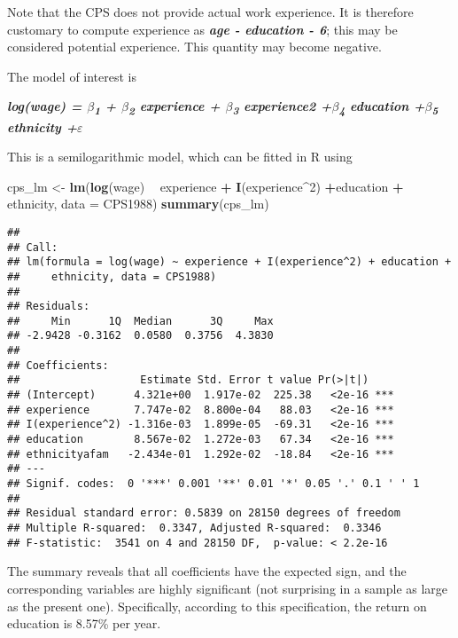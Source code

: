 \documentclass[]{article}
\newenvironment{Shaded}{\begin{snugshade}}{\end{snugshade}}
\newcommand{\KeywordTok}[1]{\textcolor[rgb]{0.13,0.29,0.53}{\textbf{#1}}}
\newcommand{\DataTypeTok}[1]{\textcolor[rgb]{0.13,0.29,0.53}{#1}}
\newcommand{\DecValTok}[1]{\textcolor[rgb]{0.00,0.00,0.81}{#1}}
\newcommand{\StringTok}[1]{\textcolor[rgb]{0.31,0.60,0.02}{#1}}
\newcommand{\OperatorTok}[1]{\textcolor[rgb]{0.81,0.36,0.00}{\textbf{#1}}}
\newcommand{\NormalTok}[1]{#1}
\begin{document}
Note that the CPS does not provide actual work experience. It is
therefore customary to compute experience as \textbf{\emph{age -
education - 6}}; this may be considered potential experience. This
quantity may become negative.

The model of interest is

\textbf{\emph{log(wage) = \(\beta\)\textsubscript{1} +
\(\beta\)\textsubscript{2} experience + \(\beta\)\textsubscript{3}
experience2 +\(\beta\)\textsubscript{4} education
+\(\beta\)\textsubscript{5} ethnicity +\(\varepsilon\) }}

This is a semilogarithmic model, which can be fitted in R using

\begin{Shaded}
\begin{Highlighting}[]
\NormalTok{cps_lm <-}\StringTok{ }\KeywordTok{lm}\NormalTok{(}\KeywordTok{log}\NormalTok{(wage) }\OperatorTok{~}\StringTok{ }\NormalTok{experience }\OperatorTok{+}\StringTok{ }\KeywordTok{I}\NormalTok{(experience}\OperatorTok{^}\DecValTok{2}\NormalTok{) }\OperatorTok{+}\NormalTok{education }\OperatorTok{+}\StringTok{ }\NormalTok{ethnicity, }\DataTypeTok{data =}\NormalTok{ CPS1988)}
\KeywordTok{summary}\NormalTok{(cps_lm)}
\end{Highlighting}
\end{Shaded}

\begin{verbatim}
## 
## Call:
## lm(formula = log(wage) ~ experience + I(experience^2) + education + 
##     ethnicity, data = CPS1988)
## 
## Residuals:
##     Min      1Q  Median      3Q     Max 
## -2.9428 -0.3162  0.0580  0.3756  4.3830 
## 
## Coefficients:
##                   Estimate Std. Error t value Pr(>|t|)    
## (Intercept)      4.321e+00  1.917e-02  225.38   <2e-16 ***
## experience       7.747e-02  8.800e-04   88.03   <2e-16 ***
## I(experience^2) -1.316e-03  1.899e-05  -69.31   <2e-16 ***
## education        8.567e-02  1.272e-03   67.34   <2e-16 ***
## ethnicityafam   -2.434e-01  1.292e-02  -18.84   <2e-16 ***
## ---
## Signif. codes:  0 '***' 0.001 '**' 0.01 '*' 0.05 '.' 0.1 ' ' 1
## 
## Residual standard error: 0.5839 on 28150 degrees of freedom
## Multiple R-squared:  0.3347, Adjusted R-squared:  0.3346 
## F-statistic:  3541 on 4 and 28150 DF,  p-value: < 2.2e-16
\end{verbatim}

The summary reveals that all coefficients have the expected sign, and
the corresponding variables are highly significant (not surprising in a
sample as large as the present one). Specifically, according to this
specification, the return on education is 8.57\% per year.
\end{document}
